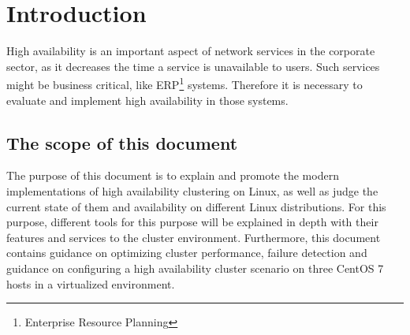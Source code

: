 


\section{Introduction}

High availability is an important aspect of network services in the corporate
sector, as it decreases the time a service is unavailable to users.
Such services might be business critical, like ERP\footnote{Enterprise Resource Planning} systems.
Therefore it is necessary to evaluate and implement high availability in those systems.

\subsection{The scope of this document}
The purpose of this document is to explain and promote the modern implementations 
of high availability clustering on Linux, as well as judge the current state
of them and availability on different Linux distributions.
For this purpose, different tools for this purpose will be explained in 
depth with their features and services to the cluster environment. 
Furthermore, this document contains guidance on optimizing cluster performance, 
failure detection and guidance on configuring a high availability cluster 
scenario on three CentOS 7 hosts in a virtualized environment.
